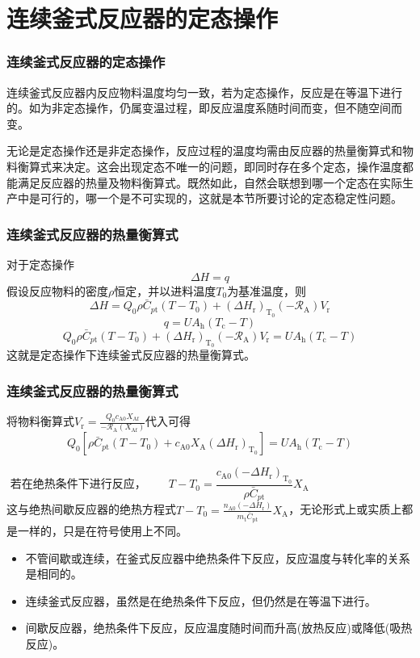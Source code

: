 \section{连续釜式反应器的定态操作}


\begin{frame}
    \frametitle{连续釜式反应器的定态操作}

    \large 连续釜式反应器内反应物料温度均匀一致，若为定态操作，反应是在等温下进行的。如为非定态操作，仍属变温过程，即反应温度系随时间而变，但不随空间而变。
    
    无论是定态操作还是非定态操作，反应过程的温度均需由反应器的热量衡算式和物料衡算式来决定。这会出现定态不唯一的问题，即同时存在多个定态，操作温度都能满足反应器的热量及物料衡算式。既然如此，自然会联想到哪一个定态在实际生产中是可行的，哪一个是不可实现的，这就是本节所要讨论的定态稳定性问题。

\end{frame}


\begin{frame}
    \frametitle{连续釜式反应器的热量衡算式}

    \large 对于定态操作
    \[
        \Delta H = q
    \]
    假设反应物料的密度$\rho$恒定，并以进料温度$T_0$为基准温度，则
    \[
        \Delta H=Q_{0} \rho \bar{C}_{p \mathrm{t}}(T-T_{0})+(\Delta H_{\mathrm{r}})_{\mathrm{T}_{0}}(-\mathscr{R}_{\mathrm{A}}) V_{\mathrm{r}}
    \]
    \[
        q=U A_{\mathrm{h}}(T_{\mathrm{c}}-T)
    \]
    \[
       Q_{0} \rho \bar{C}_{p \mathrm{t}}(T-T_{0})+(\Delta H_{\mathrm{r}})_{\mathrm{T}_{0}}(-\mathscr{R}_{\mathrm{A}}) V_{\mathrm{r}} = U A_{\mathrm{h}}(T_{\mathrm{c}}-T)
    \]
    这就是定态操作下连续釜式反应器的热量衡算式。

\end{frame}


\begin{frame}
    \frametitle{连续釜式反应器的热量衡算式}

    将物料衡算式$V_{\mathrm{r}}=\frac{Q_{0} c_{\mathrm{A} 0} X_{\mathrm{Af}}}{-\mathscr{R}_{\mathrm{A}}(X_{\mathrm{Af}})}$代入可得
    \[
        Q_{0}[\rho \bar{C}_{p \mathrm{t}}(T-T_{0})+c_{\mathrm{A} 0} X_{\mathrm{A}}(\Delta H_{\mathrm{r}})_{\mathrm{T}_{0}}]=U A_{\mathrm{h}}(T_{\mathrm{c}}-T)
    \]
    
    \[
        \text{若在绝热条件下进行反应，} \qquad T-T_{0}=\frac{{c_{\mathrm{A} 0}}(-\Delta H_{\mathrm{r}})_{\mathrm{T}_{0}}}{\rho \bar{C}_{p \mathrm{t}}} X_{\mathrm{A}} \qquad\qquad\qquad\qquad~~~~
    \]
    这与绝热间歇反应器的绝热方程式$T-T_{0}=\frac{n_{\mathrm{A} 0}(-\Delta H_{\mathrm{r}})}{m_{\mathrm{t}} \bar{C}_{\mathrm{pt}}} X_{\mathrm{A}}$，无论形式上或实质上都是一样的，只是在符号使用上不同。
    \begin{itemize}
        \item 不管间歇或连续，在釜式反应器中绝热条件下反应，反应温度与转化率的关系是相同的。
        \item 连续釜式反应器，虽然是在绝热条件下反应，但仍然是在等温下进行。
        \item 间歇反应器，绝热条件下反应，反应温度随时间而升高(放热反应)或降低(吸热反应)。
    \end{itemize}
\end{frame}


